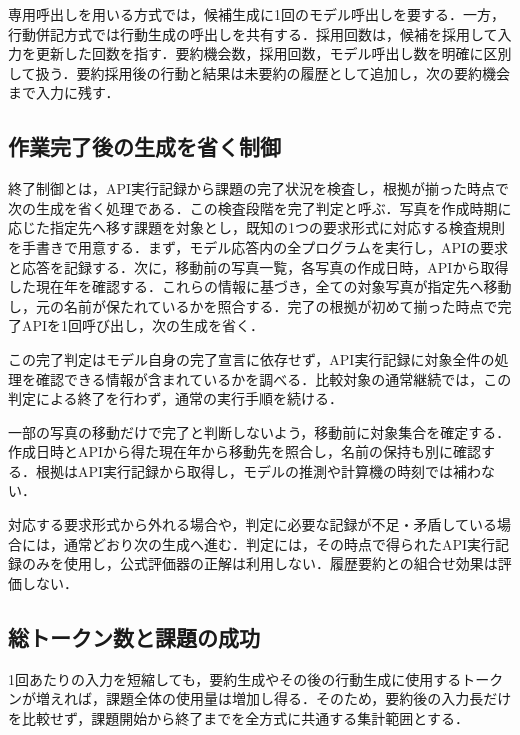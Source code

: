 \documentclass[letter]{ieicej}
\begin{document}
専用呼出しを用いる方式では，候補生成に1回のモデル呼出しを要する．一方，行動併記方式では行動生成の呼出しを共有する．採用回数は，候補を採用して入力を更新した回数を指す．要約機会数，採用回数，モデル呼出し数を明確に区別して扱う．要約採用後の行動と結果は未要約の履歴として追加し，次の要約機会まで入力に残す．

\subsection{作業完了後の生成を省く制御}

終了制御とは，API実行記録から課題の完了状況を検査し，根拠が揃った時点で次の生成を省く処理である．この検査段階を完了判定と呼ぶ．写真を作成時期に応じた指定先へ移す課題を対象とし，既知の1つの要求形式に対応する検査規則を手書きで用意する．まず，モデル応答内の全プログラムを実行し，APIの要求と応答を記録する．次に，移動前の写真一覧，各写真の作成日時，APIから取得した現在年を確認する．これらの情報に基づき，全ての対象写真が指定先へ移動し，元の名前が保たれているかを照合する．完了の根拠が初めて揃った時点で完了APIを1回呼び出し，次の生成を省く．

この完了判定はモデル自身の完了宣言に依存せず，API実行記録に対象全件の処理を確認できる情報が含まれているかを調べる．比較対象の通常継続では，この判定による終了を行わず，通常の実行手順を続ける．

一部の写真の移動だけで完了と判断しないよう，移動前に対象集合を確定する．作成日時とAPIから得た現在年から移動先を照合し，名前の保持も別に確認する．根拠はAPI実行記録から取得し，モデルの推測や計算機の時刻では補わない．

対応する要求形式から外れる場合や，判定に必要な記録が不足・矛盾している場合には，通常どおり次の生成へ進む．判定には，その時点で得られたAPI実行記録のみを使用し，公式評価器の正解は利用しない．履歴要約との組合せ効果は評価しない．

\subsection{総トークン数と課題の成功}

1回あたりの入力を短縮しても，要約生成やその後の行動生成に使用するトークンが増えれば，課題全体の使用量は増加し得る．そのため，要約後の入力長だけを比較せず，課題開始から終了までを全方式に共通する集計範囲とする．
\end{document}

